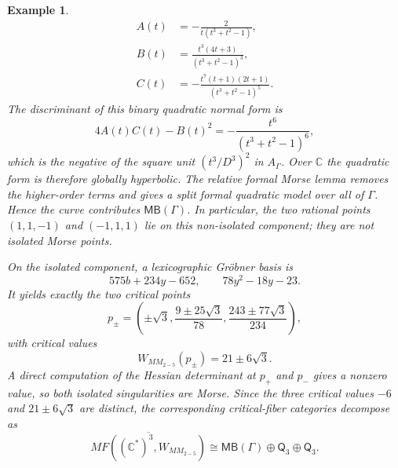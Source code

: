 \documentclass[11pt]{amsart}
\newtheorem{example}{Example}[section]
\newcommand{\MorseCat}[1]{\mathsf{Q}_{#1}}
\newcommand{\MBcat}[1]{\mathsf{MB}(#1)}
\begin{document}
\begin{example}
\[\begin{aligned}
A(t)&=-\frac{2}{t(t^3+t^2-1)},\\
B(t)&=\frac{t^3(4t+3)}{(t^3+t^2-1)^3},\\
C(t)&=-\frac{t^7(t+1)(2t+1)}{(t^3+t^2-1)^5}.
\end{aligned}
\]
The discriminant of this binary quadratic normal form is
\[
4A(t)C(t)-B(t)^2=-\frac{t^6}{(t^3+t^2-1)^6},
\]
which is the negative of the square unit $(t^3/D^3)^2$ in $A_{\Gamma}$. Over
$\mathbb C$ the quadratic form is therefore globally hyperbolic. The relative
formal Morse lemma removes the higher-order terms and gives a split formal
quadratic model over all of $\Gamma$. Hence the curve contributes
$\MBcat{\Gamma}$. In particular, the two rational points $(1,1,-1)$ and
$(-1,1,1)$ lie on this non-isolated component; they are not isolated Morse
points.

On the isolated component, a lexicographic Gr\"obner basis is
\[
575b+234y-652,
\qquad
78y^2-18y-23.
\]
It yields exactly the two critical points
\[
p_{\pm}=\left(\pm\sqrt{3},\frac{9\pm25\sqrt{3}}{78},\frac{243\pm77\sqrt{3}}{234}\right),
\]
with critical values
\[
W_{MM_{2-5}}(p_{\pm})=21\pm6\sqrt{3}.
\]
A direct computation of the Hessian determinant at $p_{+}$ and $p_{-}$ gives
a nonzero value, so both isolated singularities are Morse. Since the three
critical values $-6$ and $21\pm6\sqrt3$ are distinct, the corresponding
critical-fiber categories decompose as
\[
\overline{MF((\mathbb{C}^*)^3,W_{MM_{2-5}})}
\cong \MBcat{\Gamma} \oplus \MorseCat{3}\oplus \MorseCat{3}.
\]
\end{example}
\end{document}

